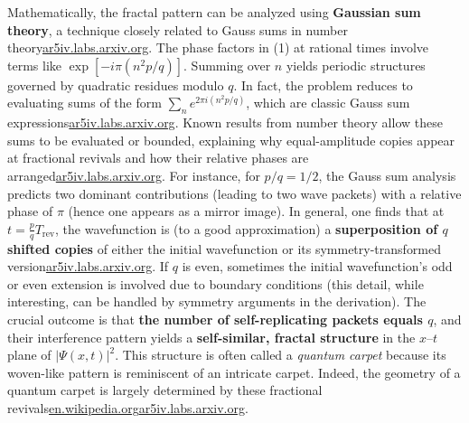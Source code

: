 \documentclass[11pt,a4paper]{article}
\begin{document}
Mathematically, the fractal pattern can be analyzed using \textbf{Gaussian sum theory}, a technique closely related to Gauss sums in number theory\href{https://ar5iv.labs.arxiv.org/html/1808.09708#:~:text=In fact%2C the same phenomenon,the help of Gaussian sum}{ar5iv.labs.arxiv.org}. The phase factors in (1) at rational times involve terms like $\exp[-i \pi (n^2 p/q)]$. Summing over $n$ yields periodic structures governed by quadratic residues modulo $q$. In fact, the problem reduces to evaluating sums of the form $\sum_{n} e^{2\pi i (n^2 p/q)}$, which are classic Gauss sum expressions\href{https://ar5iv.labs.arxiv.org/html/1808.09708#:~:text=where is called as the,integer and %2C we have}{ar5iv.labs.arxiv.org}. Known results from number theory allow these sums to be evaluated or bounded, explaining why equal-amplitude copies appear at fractional revivals and how their relative phases are arranged\href{https://ar5iv.labs.arxiv.org/html/1808.09708#:~:text=where is called as the,integer and %2C we have}{ar5iv.labs.arxiv.org}. For instance, for $p/q=1/2$, the Gauss sum analysis predicts two dominant contributions (leading to two wave packets) with a relative phase of $\pi$ (hence one appears as a mirror image). In general, one finds that at $t=\frac{p}{q}T_{\text{rev}}$, the wavefunction is (to a good approximation) a \textbf{superposition of $q$ shifted copies} of either the initial wavefunction or its symmetry-transformed version\href{https://ar5iv.labs.arxiv.org/html/1808.09708#:~:text=where is absolute phase and,separated by in coordinate}{ar5iv.labs.arxiv.org}. If $q$ is even, sometimes the initial wavefunction’s odd or even extension is involved due to boundary conditions (this detail, while interesting, can be handled by symmetry arguments in the derivation). The crucial outcome is that \textbf{the number of self-replicating packets equals $q$}, and their interference pattern yields a \textbf{self-similar, fractal structure} in the $x$–$t$ plane of $|\Psi(x,t)|^2$. This structure is often called a \emph{quantum carpet} because its woven-like pattern is reminiscent of an intricate carpet. Indeed, the geometry of a quantum carpet is largely determined by these fractional revivals\href{https://en.wikipedia.org/wiki/Quantum_carpet#:~:text=with reflecting boundaries,by the quantum fractional revivals}{en.wikipedia.org}\href{https://ar5iv.labs.arxiv.org/html/1808.09708#:~:text=Apart from the full revival,shall see%2C the wave function}{ar5iv.labs.arxiv.org}.
\end{document}
